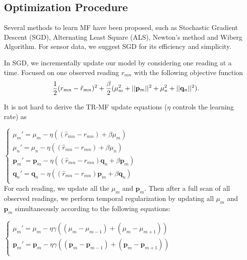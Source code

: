 \subsection{Optimization Procedure}
\label{optimation_procedure}
Several methods to learn MF have been proposed, such as Stochastic Gradient Descent (SGD)\cite{koren2009matrix,chih2008large}, Alternating Least Square (ALS)\cite{koren2009matrix,zhou2008large}, Newton's method\cite{buchanan2005damped} and Wiberg Algorithm\cite{okatani2007wiberg}.
For sensor data, we suggest SGD for its efficiency and simplicity. 

In SGD, we incrementally update our model by considering one reading at a time.
Focused on one observed reading $r_{mn}$ with the following objective function
\begin{equation*} \small \frac{1}{2}(r_{mn} - \hat{r}_{mn})^2
+ \frac{\beta}{2}(\mu_m^2 + ||\mathbf{p}_m||^2 + \mu_n^2 + ||\mathbf{q}_n||^2).\end{equation*}

It is not hard to derive the TR-MF update equations ($\eta$ controls the learning rate) as 

\indent	$ \begin{cases} 
	\mu_m' = \mu_m - \eta ((\hat{r}_{mn}-r_{mn}) + \beta \mu_m) \\
	\mu_n' = \mu_n - \eta ((\hat{r}_{mn}-r_{mn}) + \beta \mu_n) \\
	\mathbf{p}_{m}' = \mathbf{p}_{m} - \eta ((\hat{r}_{mn}-r_{mn})\mathbf{q}_{n} + \beta \mathbf{p}_{m})\\
	\mathbf{q}_{n}' = \mathbf{q}_{n} - \eta ((\hat{r}_{mn}-r_{mn})\mathbf{p}_{m} + \beta \mathbf{q}_{n})\\
	\end{cases} $ \\

For each reading, we update all the $\mu_m$ and $\mathbf{p}_m$. Then after a full scan of all observed readings, 
we perform temporal regularization by updating all $\mu_m$ and $\mathbf{p}_m$ simultaneously according to the following equations:

\indent $ \begin{cases}
	\mu_m' = \mu_m - \eta \gamma((\mu_m-\mu_{m-1})+(\mu_m-\mu_{m+1}))\\
	\mathbf{p}_{m}' = \mathbf{p}_{m} - \eta \gamma((\mathbf{p}_{m}-\mathbf{p}_{m-1})+(\mathbf{p}_{m}-\mathbf{p}_{m+1}))\\
	\end{cases} $\\

